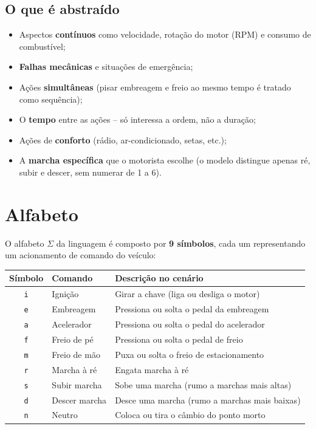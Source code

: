 \documentclass[12pt,a4paper]{article}
\begin{document}
\subsection{O que é abstraído}
\begin{itemize}
    \item Aspectos \textbf{contínuos} como velocidade, rotação do motor (RPM) e consumo de combustível;
    \item \textbf{Falhas mecânicas} e situações de emergência;
    \item Ações \textbf{simultâneas} (pisar embreagem e freio ao mesmo tempo é tratado como sequência);
    \item O \textbf{tempo} entre as ações -- só interessa a ordem, não a duração;
    \item Ações de \textbf{conforto} (rádio, ar-condicionado, setas, etc.);
    \item A \textbf{marcha específica} que o motorista escolhe (o modelo distingue apenas ré, subir e descer, sem numerar de 1 a 6).
\end{itemize}

\section{Alfabeto}

O alfabeto $\Sigma$ da linguagem é composto por \textbf{9 símbolos}, cada um representando um acionamento de comando do veículo:

\begin{center}
\begin{tabular}{|c|l|l|}
    \hline
    \textbf{Símbolo} & \textbf{Comando} & \textbf{Descrição no cenário} \\
    \hline
    \texttt{i} & Ignição       & Girar a chave (liga ou desliga o motor) \\
    \texttt{e} & Embreagem     & Pressiona ou solta o pedal da embreagem \\
    \texttt{a} & Acelerador    & Pressiona ou solta o pedal do acelerador \\
    \texttt{f} & Freio de pé   & Pressiona ou solta o pedal de freio \\
    \texttt{m} & Freio de mão  & Puxa ou solta o freio de estacionamento \\
    \texttt{r} & Marcha à ré   & Engata marcha à ré \\
    \texttt{s} & Subir marcha  & Sobe uma marcha (rumo a marchas mais altas) \\
    \texttt{d} & Descer marcha & Desce uma marcha (rumo a marchas mais baixas) \\
    \texttt{n} & Neutro        & Coloca ou tira o câmbio do ponto morto \\
    \hline
\end{tabular}
\end{center}
\end{document}
